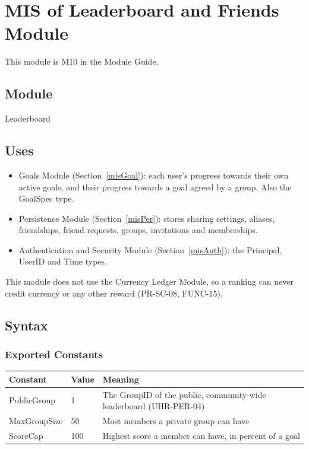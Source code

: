 \documentclass[12pt, titlepage]{article}
\begin{document}
\section{MIS of Leaderboard and Friends Module} \label{misLead}

This module is M10 in the Module Guide.

\subsection{Module}

Leaderboard

\subsection{Uses}

\begin{itemize}
\item Goals Module (Section~\ref{misGoal}): each user's progress towards
  their own active goals, and their progress towards a goal agreed by a
  group. Also the GoalSpec type.
\item Persistence Module (Section~\ref{misPer}): stores sharing settings,
  aliases, friendships, friend requests, groups, invitations and
  memberships.
\item Authentication and Security Module (Section~\ref{misAuth}): the
  Principal, UserID and Time types.
\end{itemize}

\noindent This module does not use the Currency Ledger Module, so a ranking
can never credit currency or any other reward (PR-SC-08, FUNC-15).

\subsection{Syntax}

\subsubsection{Exported Constants}

\begin{center}
\renewcommand{\arraystretch}{1.2}
\begin{tabular}{l l >{\raggedright\arraybackslash}p{7.5cm}}
\toprule
\textbf{Constant} & \textbf{Value} & \textbf{Meaning}\\
\midrule
\textsf{PublicGroup} & 1 & The GroupID of the public, community-wide
  leaderboard (UHR-PER-04)\\
\textsf{MaxGroupSize} & 50 & Most members a private group can have\\
\textsf{ScoreCap} & 100 & Highest score a member can have, in percent of a
  goal\\
\bottomrule
\end{tabular}
\end{center}
\end{document}
